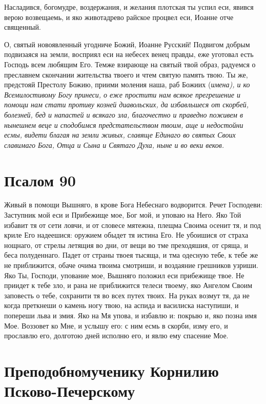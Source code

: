 

Насладився, богомудре, воздержания, и желания плотская ты успил еси, явився верою возвещаемь, и яко животадрево райское процвел еси, Иоанне  отче священный.




О, святый новоявленный угодниче Божий, Иоанне Русский! Подвигом добрым подвизаяся на земли, восприял еси на небесех венец правды, еже уготовал есть Господь всем любящим Его. Темже взирающе на святый твой образ, радуемся о преславнем скончании жительства твоего и чтем святую память твою. Ты же, предстояй Престолу Божию, приими моления наша, раб Божиих (\itshape имена\normalfont{}), и ко Всемилостивому Богу принеси, о еже простити нам всякое прегрешение и помощи нам стати противу козней диавольских, да избавльшеся от скорбей, болезней, бед и напастей и всякаго зла, благочестно и праведно поживем в нынешнем веце и сподобимся предстательством твоим, аще и недостойни есмы, видети благая на земли живых, славяще Единаго во святых Своих славимаго Бога, Отца и Сына и Святаго Духа, ныне и во веки веков.


\section{Псалом 90}
 


Живый в помощи Вышняго, в крове Бога Небеснаго водворится. Речет Господеви: Заступник мой еси и Прибежище мое, Бог мой, и уповаю на Него. Яко Той избавит тя от сети ловчи, и от словесе мятежна, плещма Своима осенит тя, и под криле Его надеешися: оружием обыдет тя истина Его. Не убоишися от страха нощнаго, от стрелы летящия во дни, от вещи во тме преходяшия, от сряща, и беса полуденнаго. Падет от страны твоея тысяща, и тма одесную тебе, к тебе же не приближится, обаче очима твоима смотриши, и воздаяние грешников узриши. Яко Ты, Господи, упование мое, Вышняго положил еси прибежище твое. Не приидет к тебе зло, и рана не приближится телеси твоему, яко Ангелом Своим заповесть о тебе, сохранити тя во всех путех твоих. На руках возмут тя, да не когда преткнеши о камень ногу твою, на аспида и василиска наступиши, и попереши льва и змия. Яко на Мя упова, и избавлю и: покрыю и, яко позна имя Мое. Воззовет ко Мне, и услышу его: с ним есмь в скорби, изму его, и прославлю его, долготою дней исполню его, и явлю ему спасение Мое.


\section{Преподобномученику Корнилию Псково-Печерскому}
 



